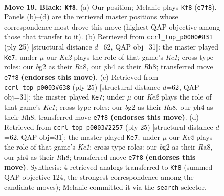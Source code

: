 \documentclass[11pt]{article}
\begin{document}
\clearpage

\begin{figure}[p]\centering
\begin{subfigure}{0.46\textwidth}\centering
\resizebox{\linewidth}{!}{%
\newchessgame
\chessboard[
  setfen={rn1r2nb/p3kp1p/P1p3p1/4p3/4P2P/2N2P2/2P3B1/R1B2RK1 b - - 0 19},
  showmover=false,
  pgfstyle=straightmove, color=movearrow, markmove={e7-f8}
]}
\caption{}
\end{subfigure}\hfill
\begin{subfigure}{0.46\textwidth}\centering
\resizebox{\linewidth}{!}{%
\newchessgame
\chessboard[
  setfen={r1b1k2r/pp1n1ppp/4p3/3pP3/3N1P2/8/PPP3PP/R3KB1R b KQkq - 0 13},
  showmover=false,
  pgfstyle=straightmove, color=movearrow, markmove={e8-e7}
]}
\caption{}
\end{subfigure}
\\[4pt]
\begin{subfigure}{0.46\textwidth}\centering
\resizebox{\linewidth}{!}{%
\newchessgame
\chessboard[
  setfen={r1b1k2r/pp1n1ppp/4p3/3pP3/3N1P2/8/PPP3PP/R3KB1R b KQkq - 0 13},
  showmover=false,
  pgfstyle=straightmove, color=movearrow, markmove={e8-e7}
]}
\caption{}
\end{subfigure}\hfill
\begin{subfigure}{0.46\textwidth}\centering
\resizebox{\linewidth}{!}{%
\newchessgame
\chessboard[
  setfen={r1b1k2r/pp1n1ppp/4p3/3pP3/3N1P2/8/PPP3PP/R3KB1R b KQkq - 0 13},
  showmover=false,
  pgfstyle=straightmove, color=movearrow, markmove={e8-e7}
]}
\caption{}
\end{subfigure}
\caption{\textbf{Move 19, Black: \texttt{Kf8}.} (a) Our position; Melanie plays \texttt{Kf8} (\texttt{e7f8}). Panels (b)--(d) are the retrieved master positions whose correspondence most drove this move (highest QAP objective among those that transfer to it). (b) Retrieved from \texttt{ccrl\_top\_p0000\#831} (ply 25) [structural distance $d$=62, QAP obj=31]: the master played \texttt{Ke7}; under $\mu$ our \emph{Ke2} plays the role of that game's \emph{Ke1}; cross-type roles: our \emph{b}g2 as their \emph{R}a8, our \emph{p}h4 as their \emph{R}h8; transferred move \texttt{e7f8} \textbf{(endorses this move)}. (c) Retrieved from \texttt{ccrl\_top\_p0003\#638} (ply 25) [structural distance $d$=62, QAP obj=31]: the master played \texttt{Ke7}; under $\mu$ our \emph{Ke2} plays the role of that game's \emph{Ke1}; cross-type roles: our \emph{b}g2 as their \emph{R}a8, our \emph{p}h4 as their \emph{R}h8; transferred move \texttt{e7f8} \textbf{(endorses this move)}. (d) Retrieved from \texttt{ccrl\_top\_p0003\#2257} (ply 25) [structural distance $d$=62, QAP obj=31]: the master played \texttt{Ke7}; under $\mu$ our \emph{Ke2} plays the role of that game's \emph{Ke1}; cross-type roles: our \emph{b}g2 as their \emph{R}a8, our \emph{p}h4 as their \emph{R}h8; transferred move \texttt{e7f8} \textbf{(endorses this move)}. Synthesis: 4 retrieved analogs transferred to \texttt{Kf8} (summed QAP objective 124, the strongest correspondence among the candidate moves); Melanie committed it via the \texttt{search} selector.}
\label{fig:thought-m37}
\end{figure}
\end{document}
